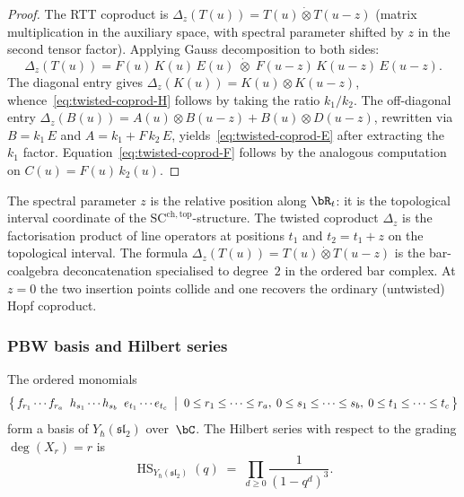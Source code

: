 \begin{proof}
The RTT coproduct is $\Delta_z(T(u)) = T(u) \dot\otimes T(u{-}z)$
(matrix multiplication in the auxiliary space, with spectral parameter
shifted by $z$ in the second tensor factor). Applying Gauss
decomposition to both sides:
\[
\Delta_z(T(u))
= F(u)\,K(u)\,E(u) \;\dot\otimes\; F(u{-}z)\,K(u{-}z)\,E(u{-}z).
\]
The diagonal entry gives
$\Delta_z(K(u)) = K(u) \otimes K(u{-}z)$,
whence~\eqref{eq:twisted-coprod-H} follows by taking the ratio
$k_1/k_2$. The off-diagonal entry
$\Delta_z(B(u)) = A(u) \otimes B(u{-}z) + B(u) \otimes D(u{-}z)$,
rewritten via $B = k_1\,E$ and $A = k_1 + F\,k_2\,E$,
yields~\eqref{eq:twisted-coprod-E} after extracting the $k_1$
factor. Equation~\eqref{eq:twisted-coprod-F} follows by the analogous
computation on $C(u) = F(u)\,k_2(u)$.
\end{proof}

\begin{remark}
\label{rem:twisted-coproduct-origin}
The spectral parameter $z$ is the relative position along $\bR_t$:
it is the topological interval coordinate of the
$\mathrm{SC}^{\mathrm{ch,top}}$-structure. The twisted coproduct
$\Delta_z$ is the factorisation product of line operators at positions
$t_1$ and $t_2 = t_1 + z$ on the topological interval. The formula
$\Delta_z(T(u)) = T(u) \dot\otimes T(u{-}z)$ is the bar-coalgebra
deconcatenation specialised to degree~$2$ in the ordered bar
complex. At $z = 0$ the two insertion points collide and one recovers
the ordinary (untwisted) Hopf coproduct.
\end{remark}

\subsubsection*{PBW basis and Hilbert series}

\begin{theorem}
\ClaimStatusProvedHere
\label{thm:PBW-yangian-sl2}
The ordered monomials
\[
\bigl\{\,
f_{r_1}\cdots f_{r_a}\;\;
h_{s_1}\cdots h_{s_b}\;\;
e_{t_1}\cdots e_{t_c}
\;\bigm|\;
0 \le r_1 \le \cdots \le r_a,\;
0 \le s_1 \le \cdots \le s_b,\;
0 \le t_1 \le \cdots \le t_c
\,\bigr\}
\]
form a basis of $Y_\hbar(\mathfrak{sl}_2)$ over~$\bC$. The Hilbert series
with respect to the grading $\deg(X_r) = r$ is
\[
\operatorname{HS}_{Y_\hbar(\mathfrak{sl}_2)}(q)
\;=\; \prod_{d \ge 0} \frac{1}{(1-q^d)^3}.
\]
\end{theorem}

